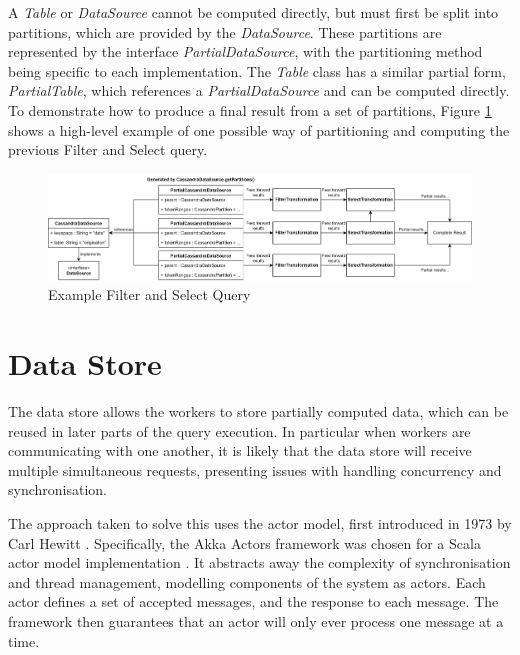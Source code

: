 A \textit{Table} or \textit{DataSource} cannot be computed directly, but must first be split into partitions, which are provided by the \textit{DataSource}. These partitions are represented by the interface \textit{PartialDataSource}, with the partitioning method being specific to each implementation. The \textit{Table} class has a similar partial form, \textit{PartialTable}, which references a \textit{PartialDataSource} and can be computed directly. To demonstrate how to produce a final result from a set of partitions, Figure \ref{fig:partial-filter-select-query} shows a high-level example of one possible way of partitioning and computing the previous Filter and Select query.

\begin{figure}[htp]
	\centering
	\includegraphics[width=\textwidth]{chapters/diagrams/implementation/partial-filter-select-query}
	\caption{Example Filter and Select Query}
	\label{fig:partial-filter-select-query}
\end{figure}


\pagebreak
\section{Data Store}
The data store allows the workers to store partially computed data, which can be reused in later parts of the query execution. In particular when workers are communicating with one another, it is likely that the data store will receive multiple simultaneous requests, presenting issues with handling concurrency and synchronisation.

The approach taken to solve this uses the actor model, first introduced in 1973 by Carl Hewitt \cite{hewitt1973session}. Specifically, the Akka Actors framework was chosen for a Scala actor model implementation \cite{akkaactors}. It abstracts away the complexity of synchronisation and thread management, modelling components of the system as actors. Each actor defines a set of accepted messages, and the response to each message. The framework then guarantees that an actor will only ever process one message at a time.

